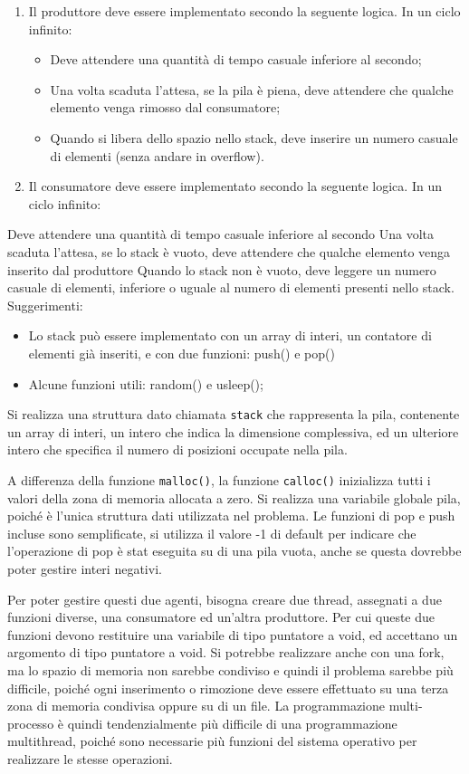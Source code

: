 \documentclass{article}
\numberwithin{equation}{subsection}
\begin{document}
\begin{enumerate}
    \item Il produttore deve essere implementato secondo la seguente logica. In un ciclo infinito:
    \begin{itemize}
        \item Deve attendere una quantità di tempo casuale inferiore al secondo;
        \item Una volta scaduta l'attesa, se la pila è piena, deve attendere che qualche elemento venga rimosso dal consumatore;
        \item Quando si libera dello spazio nello stack, deve inserire un numero casuale di elementi (senza andare in overflow).
    \end{itemize}
    \item Il consumatore deve essere implementato secondo la seguente logica. In un ciclo infinito:
\end{enumerate}
Deve attendere una quantità di tempo casuale inferiore al secondo
Una volta scaduta l'attesa, se lo stack è vuoto, deve attendere che qualche elemento venga inserito dal produttore
Quando lo stack non è vuoto, deve leggere un numero casuale di elementi, inferiore o uguale al numero di elementi presenti nello stack.
Suggerimenti:
\begin{itemize}
    \item Lo stack può essere implementato con un array di interi, un contatore di elementi già inseriti, e con due funzioni: push() e pop()
    \item Alcune funzioni utili: random() e usleep();  
\end{itemize}

Si realizza una struttura dato chiamata \verb|stack| che rappresenta la pila, 
contenente un array di interi, un intero che indica la dimensione complessiva, ed un 
ulteriore intero che specifica il numero di posizioni occupate nella pila. 


A differenza della funzione \verb|malloc()|, la funzione \verb|calloc()| inizializza 
tutti i valori della zona di memoria allocata a zero. Si realizza una variabile globale 
pila, poiché è l'unica struttura dati utilizzata nel problema. Le funzioni di pop e 
push incluse sono semplificate, si utilizza il valore -1 di default per indicare 
che l'operazione di pop è stat eseguita su di una pila vuota, anche se questa dovrebbe 
poter gestire interi negativi. 

Per poter gestire questi due agenti, bisogna creare due thread, assegnati a due funzioni 
diverse, una consumatore ed un'altra produttore. Per cui queste due funzioni devono 
restituire una variabile di tipo puntatore a void, ed accettano un argomento 
di tipo puntatore a void. 
Si potrebbe realizzare anche con una fork, ma lo spazio di memoria non sarebbe 
condiviso e quindi il problema sarebbe più difficile, poiché ogni inserimento 
o rimozione deve essere effettuato su una terza zona di memoria condivisa 
oppure su di un file. La programmazione multi-processo è quindi 
tendenzialmente più difficile di una programmazione multithread, poiché sono 
necessarie più funzioni del sistema operativo per realizzare le stesse 
operazioni. 
\end{document}
